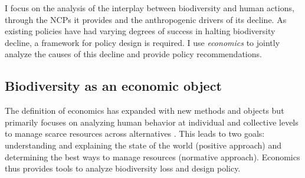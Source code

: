 I focus on the analysis of the interplay between biodiversity and human actions, through the NCPs it provides and the anthropogenic drivers of its decline. As existing policies have had varying degrees of success in halting biodiversity decline, a framework for policy design is required. I use \textit{economics} to jointly analyze the causes of this decline and provide policy recommendations. 


\subsection*{Biodiversity as an economic object}
The definition of economics has expanded with new methods and objects but primarily focuses on analyzing human behavior at individual and collective levels to manage scarce resources across alternatives \citep{mankiw_principles_2011, bade_foundations_2002, backhouse_retrospectives_2009}. This leads to two goals: understanding and explaining the state of the world (positive approach) and determining the best ways to manage resources (normative approach). Economics thus provides tools to analyze biodiversity loss and design policy.

